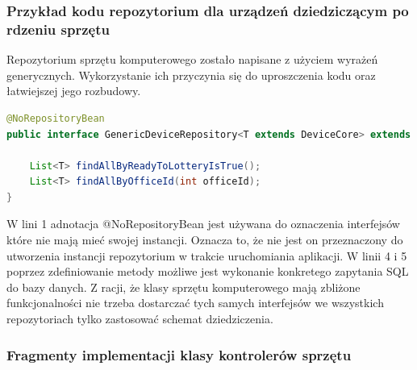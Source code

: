 \subsubsection{Przykład kodu repozytorium dla urządzeń dziedziczącym po rdzeniu sprzętu}
Repozytorium sprzętu komputerowego zostało napisane z użyciem wyrażeń generycznych. Wykorzystanie ich przyczynia się do uproszczenia kodu oraz łatwiejszej jego rozbudowy.

\begin{lstlisting}[language=Java, style=JavaStyle,  caption={Generyczne repozytorium sprzętu komputerowego:  GenericDeviceRepository}, label={repo_genericDevice}]
@NoRepositoryBean
public interface GenericDeviceRepository<T extends DeviceCore> extends JpaRepository<T, Integer> {
    
    List<T> findAllByReadyToLotteryIsTrue();
    List<T> findAllByOfficeId(int officeId);
}
\end{lstlisting}

W lini 1 adnotacja @NoRepositoryBean jest używana do oznaczenia interfejsów które nie mają mieć swojej instancji. Oznacza to, że nie jest on przeznaczony do utworzenia instancji repozytorium w trakcie uruchomiania aplikacji. W linii 4 i 5 poprzez zdefiniowanie metody możliwe jest wykonanie konkretego zapytania SQL do bazy danych. Z racji, że klasy sprzętu komputerowego mają zbliżone funkcjonalności nie trzeba dostarczać tych samych interfejsów we wszystkich repozytoriach tylko zastosować schemat dziedziczenia.

\subsubsection{Fragmenty implementacji klasy kontrolerów sprzętu}

